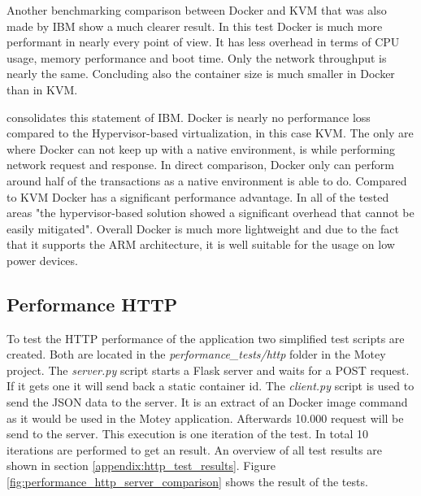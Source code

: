 Another benchmarking comparison\autocite{Russell:Performance:2014} between Docker and \ac{KVM} that was also made by IBM show a much clearer result.
In this test Docker is much more performant in nearly every point of view.
It has less overhead in terms of \ac{CPU} usage\autocite[cf.][p. 25]{Russell:Performance:2014}, memory performance\autocite[cf.][p. 50]{Russell:Performance:2014} and boot time\autocite[cf.][p. 24]{Russell:Performance:2014}.
Only the network throughput is nearly the same.\autocite[cf.][p. 52]{Russell:Performance:2014}
Concluding also the container size is much smaller in Docker than in \ac{KVM}.\autocite[cf.][p. 66]{Russell:Performance:2014}\newline

\autocite{Ramalho:2016} consolidates this statement of IBM.
Docker is nearly no performance loss compared to the Hypervisor-based virtualization, in this case \ac{KVM}.\autocite[cf.][p. 3 ff.]{Ramalho:2016}
The only are where Docker can not keep up with a native environment, is while performing network request and response.
In direct comparison, Docker only can perform around half of the transactions as a native environment is able to do.\autocite[cf.][p. 6]{Ramalho:2016}
Compared to \ac{KVM} Docker has a significant performance advantage.
In all of the tested areas "the hypervisor-based solution showed a significant overhead that cannot be easily mitigated"\autocite[p. 6]{Ramalho:2016}.
Overall Docker is much more lightweight and due to the fact that it supports the ARM architecture, it is well suitable for the usage on low power devices.

\subsection{Performance HTTP}
To test the \ac{HTTP} performance of the application two simplified test scripts are created.
Both are located in the \textit{performance\_tests/http} folder in the Motey project.
The \textit{server.py} script starts a Flask server and waits for a POST request.
If it gets one it will send back a static container id.
The \textit{client.py} script is used to send the \ac{JSON} data to the server.
It is an extract of an Docker image command as it would be used in the Motey application.
Afterwards 10.000 request will be send to the server.
This execution is one iteration of the test.
In total 10 iterations are performed to get an result.
An overview of all test results are shown in section \ref{appendix:http_test_results}.
Figure \ref{fig:performance_http_server_comparison} shows the result of the tests.

